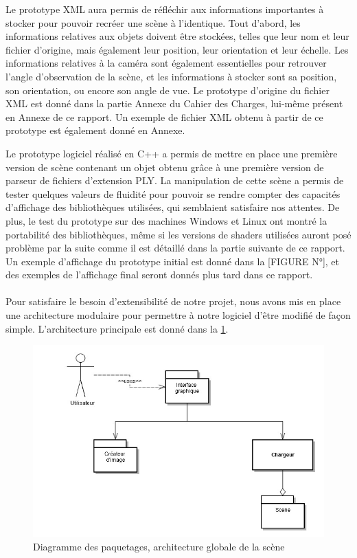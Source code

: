             Le prototype XML aura permis de réfléchir aux informations importantes à stocker pour pouvoir recréer une scène à l'identique. Tout d'abord, les informations relatives aux objets doivent être stockées, telles que leur nom et leur fichier d'origine, mais également leur position, leur orientation et leur échelle. Les informations relatives à la caméra sont également essentielles pour retrouver l'angle d'observation de la scène, et les informations à stocker sont sa position, son orientation, ou encore son angle de vue. Le prototype d'origine du fichier XML est donné dans la partie Annexe du Cahier des Charges, lui-même présent en Annexe de ce rapport. Un exemple de fichier XML obtenu à partir de ce prototype est également donné en Annexe.

            Le prototype logiciel réalisé en C++ a permis de mettre en place une première version de scène contenant un objet obtenu grâce à une première version de parseur de fichiers d'extension PLY. La manipulation de cette scène a permis de tester quelques valeurs de fluidité pour pouvoir se rendre compter des capacités d'affichage des bibliothèques utilisées, qui semblaient satisfaire nos attentes. De plus, le test du prototype sur des machines Windows et Linux ont montré la portabilité des bibliothèques, même si les versions de shaders utilisées auront posé problème par la suite comme il est détaillé dans la partie suivante de ce rapport. Un exemple d'affichage du prototype initial est donné dans la [FIGURE N°], et des exemples de l'affichage final seront donnés plus tard dans ce rapport.

\paragraph{}
        Pour satisfaire le besoin d'extensibilité de notre projet, nous avons mis en place une architecture modulaire pour permettre à notre logiciel d'être modifié de façon simple. L'architecture principale est donné dans la \ref{fig:archi}.

\begin{figure}[h]
	\centering      
	\includegraphics[scale=0.5]{diag_packages.jpg}
	\caption{\label{fig:archi} Diagramme des paquetages, architecture globale de la scène \protect \footnotemark }
\end{figure}

